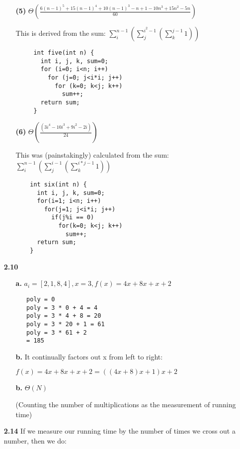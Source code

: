 \documentclass{article}
\begin{document}
\begin{enumerate}
\begin{enumerate}
  \item[\textbf{(5)}]
   $\Theta\left(\frac{6(n-1)^5+ 15(n-1)^4 + 10(n-1)^3 - n+1 - 10n^3 +15n^2 -5n}{60}\right)$

   This is derived from the sum:
   $\sum^{n-1}_{i}\left(\sum_{j}^{i^2-1}\left(
     \sum_{k}^{j-1}1\right)\right)$

   \begin{verbatim} 
     int five(int n) {
       int i, j, k, sum=0;
       for (i=0; i<n; i++)
         for (j=0; j<i*i; j++)
           for (k=0; k<j; k++)
             sum++;
       return sum;
     }
   \end{verbatim}

  \item[\textbf{(6)}]
   $\Theta\left(\frac{(3i^4-10i^3+9i^2-2i)}{24}\right)$

     This was (painstakingly) calculated from the sum:
     $\sum^{n-1}_{i}\left(\sum_{j}^{i-1}\left(
       \sum_{k}^{i*j-1}1\right)\right)$

   \begin{verbatim}
    int six(int n) {
      int i, j, k, sum=0;
      for(i=1; i<n; i++)
        for(j=1; j<i*i; j++)
          if(j%i == 0) 
            for(k=0; k<j; k++) 
              sum++;
      return sum;
    }
   \end{verbatim}

 \end{enumerate}

\item[\textbf{2.10}]

 \begin{enumerate}
  \item[\textbf{a.}]
   $a_i = [2,1,8,4], x = 3, f(x) = 4x + 8x + x + 2$
   \begin{verbatim}
   poly = 0
   poly = 3 * 0 + 4 = 4
   poly = 3 * 4 + 8 = 20
   poly = 3 * 20 + 1 = 61
   poly = 3 * 61 + 2
   = 185
   \end{verbatim}
  \item[\textbf{b.}]
   It continually factors out x from left to right:
 
   $f(x) = 4x + 8x + x + 2 = ((4x + 8)x + 1)x + 2$
 
  \item[\textbf{b.}]
   $\Theta(N)$

   (Counting the number of multiplications as the measurement of running time)

 \end{enumerate}
 
 \item[\textbf{2.14}]
  If we measure our running time by the number of times we cross out a number, then we do:


\end{enumerate}
\end{document}
